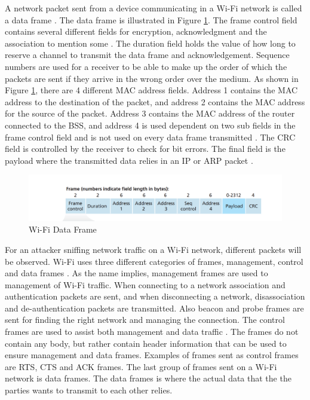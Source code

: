 A network packet sent from a device communicating in a \gls{Wi-Fi} network is called a data frame \cite{Datacom}. The data frame is illustrated in Figure \ref{fig:WiFiDataframe}. The frame control field contains several different fields for encryption, acknowledgment and the association to mention some \cite{Datacom}. The duration field holds the value of how long to reserve a channel to transmit the data frame and acknowledgement. Sequence numbers are used for a receiver to be able to make up the order of which the packets are sent if they arrive in the wrong order over the medium. As shown in Figure \ref{fig:WiFiDataframe}, there are 4 different \gls{MAC} address fields. Address 1 contains the \gls{MAC} address to the destination of the packet, and address 2 contains the \gls{MAC} address for the source of the packet. Address 3 contains the \gls{MAC} address of the router connected to the \gls{BSS}, and address 4 is used dependent on two sub fields in the frame control field and is not used on every data frame transmitted \cite{WifiStandard}. The \gls{CRC} field is controlled by the receiver to check for bit errors. The final field is the payload where the transmitted data relies in an IP or ARP packet \cite{Datacom}. 

\begin{figure} [!h]
    \includegraphics[width=1\textwidth]{figures/WifiDataFrame.png}
    \caption{\gls{Wi-Fi} Data Frame \cite{Datacom}}
    \centering
    \label{fig:WiFiDataframe}
\end{figure}

For an attacker sniffing network traffic on a \gls{Wi-Fi} network, different packets will be observed. \gls{Wi-Fi} uses three different categories of frames, management, control and data frames \cite{WiFiFrameMGMT}. As the name implies, management frames are used to management of \gls{Wi-Fi} traffic. When connecting to a network association and authentication packets are sent, and when disconnecting a network, disassociation and de-authentication packets are transmitted. Also beacon and probe frames are sent for finding the right network and managing the connection. The control frames are used to assist both management and data traffic \cite{WiFiFrames}. The frames do not contain any body, but rather contain header information that can be used to ensure management and data frames. Examples of frames sent as control frames are \gls{RTS}, \gls{CTS} and \gls{ACK} frames. The last group of frames sent on a \gls{Wi-Fi} network is data frames. The data frames is where the actual data that the the parties wants to transmit to each other relies. 

